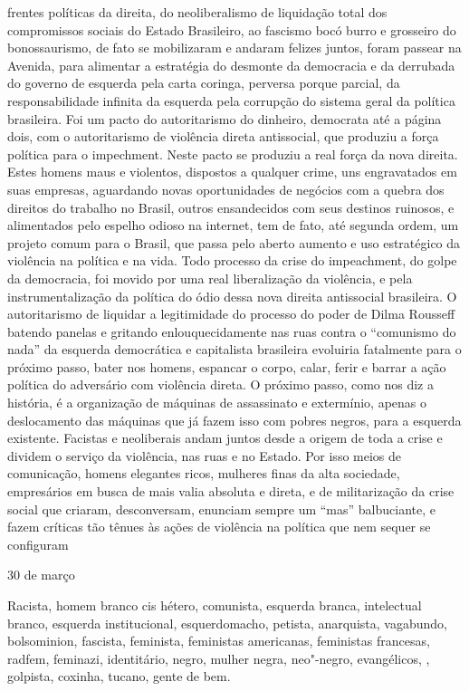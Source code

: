 frentes políticas da direita, do neoliberalismo de liquidação total dos
compromissos sociais do Estado Brasileiro, ao fascismo bocó burro e
grosseiro do bonossaurismo, de fato se mobilizaram e andaram felizes
juntos, foram passear na Avenida, para alimentar a estratégia do
desmonte da democracia e da derrubada do governo de esquerda pela carta
coringa, perversa porque parcial, da responsabilidade infinita da
esquerda pela corrupção do sistema geral da política brasileira. Foi um
pacto do autoritarismo do dinheiro, democrata até a página dois, com o
autoritarismo de violência direta antissocial, que produziu a força
política para o impechment. Neste pacto se produziu a real força da nova
direita. Estes homens maus e violentos, dispostos a qualquer crime, uns
engravatados em suas empresas, aguardando novas oportunidades de
negócios com a quebra dos direitos do trabalho no Brasil, outros
ensandecidos com seus destinos ruinosos, e alimentados pelo espelho
odioso na internet, tem de fato, até segunda ordem, um projeto comum
para o Brasil, que passa pelo aberto aumento e uso estratégico da
violência na política e na vida. Todo processo da crise do impeachment,
do golpe da democracia, foi movido por uma real liberalização da
violência, e pela instrumentalização da política do ódio dessa nova
direita antissocial brasileira. O autoritarismo de liquidar a
legitimidade do processo do poder de Dilma Rousseff batendo panelas e
gritando enlouquecidamente nas ruas contra o ``comunismo do nada'' da
esquerda democrática e capitalista brasileira evoluiria fatalmente para
o próximo passo, bater nos homens, espancar o corpo, calar, ferir e
barrar a ação política do adversário com violência direta. O próximo
passo, como nos diz a história, é a organização de máquinas de
assassinato e extermínio, apenas o deslocamento das máquinas que já
fazem isso com pobres negros, para a esquerda existente. Facistas e
neoliberais andam juntos desde a origem de toda a crise e dividem o
serviço da violência, nas ruas e no Estado. Por isso meios de
comunicação, homens elegantes ricos, mulheres finas da alta sociedade,
empresários em busca de mais valia absoluta e direta, e de militarização
da crise social que criaram, desconversam, enunciam sempre um ``mas''
balbuciante, e fazem críticas tão tênues às ações de violência na
política que nem sequer se configuram

\begin{flushright}
30 de março
\end{flushright}

Racista, homem branco cis hétero, comunista, esquerda branca,
intelectual branco, esquerda institucional, esquerdomacho, petista,
anarquista, vagabundo, bolsominion, fascista, feminista, feministas
americanas, feministas francesas, radfem, feminazi, identitário, negro,
mulher negra, neo"-negro, evangélicos, , golpista, coxinha, tucano,
gente de bem.


